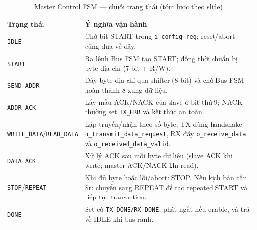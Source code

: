 \begin{table}[H]
    \centering
    \caption{Master Control FSM --- chuỗi trạng thái (tóm lược theo slide)}
    \label{tab:master_fsm_states}
    \begin{tabularx}{\textwidth}{|l|X|}
        \hline
        \textbf{Trạng thái} & \textbf{Ý nghĩa vận hành} \\
        \hline
        \texttt{IDLE} & Chờ bit START trong \texttt{i\_config\_reg}; reset/abort cũng đưa về đây. \\
        \hline
        \texttt{START} & Ra lệnh Bus FSM tạo START; đồng thời chuẩn bị byte địa chỉ (7 bit + R/W). \\
        \hline
        \texttt{SEND\_ADDR} & Đẩy byte địa chỉ qua shifter (8 bit) và chờ Bus FSM hoàn thành 8 xung dữ liệu. \\
        \hline
        \texttt{ADDR\_ACK} & Lấy mẫu ACK/NACK của slave ở bit thứ 9; NACK thường set \texttt{TX\_ERR} và kết thúc an toàn. \\
        \hline
        \texttt{WRITE\_DATA}/\texttt{READ\_DATA} & Lặp truyền/nhận theo số byte; TX dùng handshake \texttt{o\_transmit\_data\_request}, RX đẩy \texttt{o\_receive\_data} và \texttt{o\_received\_data\_valid}. \\
        \hline
        \texttt{DATA\_ACK} & Xử lý ACK sau mỗi byte dữ liệu (slave ACK khi write; master ACK/NACK khi read). \\
        \hline
        \texttt{STOP}/\texttt{REPEAT} & Khi đủ byte hoặc lỗi/abort: STOP. Nếu kịch bản cần Sr: chuyển sang REPEAT để tạo repeated START và tiếp tục transaction. \\
        \hline
        \texttt{DONE} & Set cờ \texttt{TX\_DONE/RX\_DONE}, phát ngắt nếu enable, và trả về IDLE khi bus rảnh. \\
        \hline
    \end{tabularx}
\end{table}


